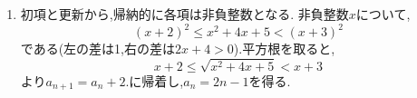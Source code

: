     \noindent {}\par\nobreak
    \begin{enumerate}[label=(\arabic*),parsep=3pt,beginpenalty=10000,format=\bookitemlink{example-gauss-role-1}{solution}{problem}]
      \item 初項と更新から,帰納的に各項は非負整数となる.
            非負整数$x$について,
            \[
              (x+2)^2\le x^2+4x+5<(x+3)^2
            \]
            である(左の差は1,右の差は$2x+4>0$).平方根を取ると,
            \[
              x+2\le\sqrt{x^2+4x+5}<x+3
            \]
            より$a_{n+1}=a_n+2$.に帰着し,$a_n=2n-1$を得る.
    \end{enumerate}
